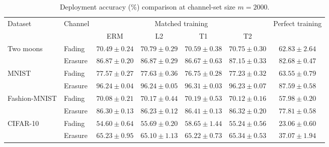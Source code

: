 \begin{table}[htb]
\centering
\caption{Deployment accuracy (\%) comparison at channel-set size $m=2000$.}
\label{tab:performance}
\begin{tabular*}{\linewidth}{@{\extracolsep{\fill}}llccccc@{}}
\toprule
\multirow{2}{*}{Dataset} & \multirow{2}{*}{Channel}
& \multicolumn{4}{c}{Matched training} & \multirow{2}{*}{Perfect training} \\
\cmidrule(lr){3-6}
& & ERM & L2 & T1 & T2 &  \\
\midrule
\multirow{2}{*}{Two moons}
& Fading
& $70.49\pm0.24$ & $\mathbf{70.79}\pm0.29$ & $70.59\pm0.38$ & $70.75\pm0.30$ & $62.83\pm2.64$ \\
& Erasure
& $86.87\pm0.20$ & $86.87\pm0.29$ & $86.67\pm0.63$ & $\mathbf{87.15}\pm0.33$ & $82.68\pm0.47$ \\
\midrule
\multirow{2}{*}{MNIST}
& Fading
& $77.57\pm0.27$ & $\mathbf{77.63}\pm0.36$ & $76.75\pm0.28$ & $77.23\pm0.32$ & $63.55\pm0.79$ \\
& Erasure
& $96.24\pm0.04$ & $96.24\pm0.05$ & $\mathbf{96.31}\pm0.03$ & $96.23\pm0.07$ & $87.59\pm0.58$ \\
\midrule
\multirow{2}{*}{Fashion-MNIST}
& Fading
& $70.08\pm0.21$ & $70.17\pm0.44$ & $\mathbf{70.19}\pm0.53$ & $70.12\pm0.16$ & $57.98\pm0.20$ \\
& Erasure
& $86.30\pm0.13$ & $86.23\pm0.12$ & $\mathbf{86.41}\pm0.13$ & $86.32\pm0.20$ & $77.81\pm0.58$ \\
\midrule
\multirow{2}{*}{CIFAR-10}
& Fading
& $54.60\pm0.64$ & $55.69\pm0.20$ & $\mathbf{58.65}\pm1.44$ & $55.24\pm0.56$ & $23.06\pm0.60$ \\
& Erasure
& $65.23\pm0.95$ & $65.10\pm1.13$ & $65.22\pm0.73$ & $\mathbf{65.34}\pm0.53$ & $37.07\pm1.94$ \\
\bottomrule
\end{tabular*}
\end{table}
